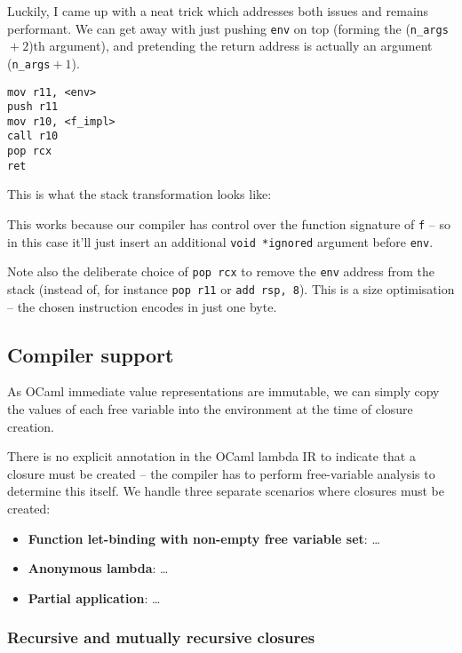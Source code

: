 \documentclass[12pt,a4paper,twoside,openright]{report}
\begin{document}
Luckily, I came up with a neat trick which addresses both issues and remains performant. We can get away with just pushing \lstinline{env} on top (forming the (\lstinline{n_args}${}+2$)th argument), and pretending the return address is actually an argument (\lstinline{n_args}${}+1$).

\begin{lstlisting}
mov r11, <env>
push r11
mov r10, <f_impl>
call r10
pop rcx
ret
\end{lstlisting}

This is what the stack transformation looks like: %

This works because our compiler has control over the function signature of
\lstinline{f}
-- so in this case it'll just insert an additional \lstinline{void *ignored} argument before \lstinline{env}.

Note also the deliberate choice of \lstinline{pop rcx} to remove the \lstinline{env} address from the stack (instead of, for instance \lstinline{pop r11} or \lstinline{add rsp, 8}). This is a size optimisation -- the chosen instruction encodes in just one byte.

\subsection{Compiler support}

As OCaml immediate value representations are immutable, we can simply copy the values of each free variable into the environment at the time of closure creation.

There is no explicit annotation in the OCaml lambda IR to indicate that a closure must be created -- the compiler has to perform free-variable analysis to determine this itself. We handle three separate scenarios where closures must be created:

\begin{itemize}
    \item \textbf{Function let-binding with non-empty free variable set}:
        \ldots
    \item \textbf{Anonymous lambda}:
        \ldots
    \item \textbf{Partial application}:
        \ldots
\end{itemize}

\subsubsection{Recursive and mutually recursive closures}
\end{document}
